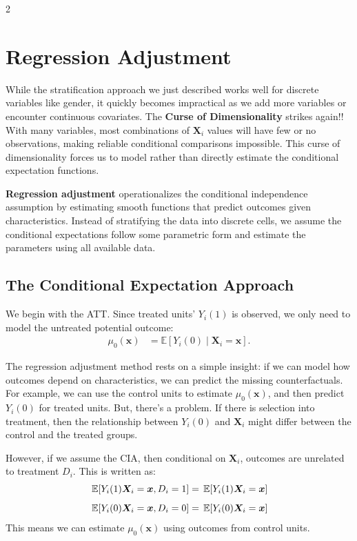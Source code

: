 \documentclass[12pt]{article}
\begin{document}
\begin{multicols}{2}
\section*{Regression Adjustment}

While the stratification approach we just described works well for discrete variables like gender, it quickly becomes impractical as we add more variables or encounter continuous covariates.
The \textbf{Curse of Dimensionality} strikes again!!
With many variables, most combinations of $\bm{X}_i$ values will have few or no observations, making reliable conditional comparisons impossible.
This curse of dimensionality forces us to model rather than directly estimate the conditional expectation functions.

\textbf{Regression adjustment} operationalizes the conditional independence assumption by estimating smooth functions that predict outcomes given characteristics.
Instead of stratifying the data into discrete cells, we assume the conditional expectations follow some parametric form and estimate the parameters using all available data.

\subsection*{The Conditional Expectation Approach}

We begin with the ATT. Since treated units' $Y_i(1)$ is observed, we only need to model the untreated potential outcome:
\begin{align*}
  \mu_0(\bm{x}) &= \mathbb{E}[Y_i(0) \mid \bm{X}_i = \bm{x}].
\end{align*}

The regression adjustment method rests on a simple insight: if we can model how outcomes depend on characteristics, we can predict the missing counterfactuals.
For example, we can use the control units to estimate $\mu_0(\bm{x})$, and then predict $Y_i(0)$ for treated units.
But, there's a problem. 
If there is selection into treatment, then the relationship between $Y_i(0)$ and $\bm{X}_i$ might differ between the control and the treated groups.

However, if we assume the CIA, then conditional on $\bm{X}_i$, outcomes are unrelated to treatment $D_i$.
This is written as:
\begin{align*}
  \expec{Y_i(1){\bm{X}_i = \bm{x}}, D_i = 1} &= \expec{Y_i(1){\bm{X}_i = \bm{x}}}  \\[0.5em]
  \expec{Y_i(0){\bm{X}_i = \bm{x}}, D_i = 0} &= \expec{Y_i(0){\bm{X}_i = \bm{x}}}  
\end{align*}
This means we can estimate $\mu_0(\bm{x})$ using outcomes from control units.


\end{multicols}
\end{document}

